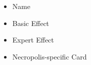 \bigskip
\begin{multicols}{2}
\begin{multicols*}{2}
  \footnotesize
  \begin{itemize}
    \item[\textbf{1.}] Name
    \item[\textbf{2.}] Basic Effect\\
    \item[\textbf{3.}] Expert Effect
    \item[\textbf{4.}] Necropolis-specific Card
  \end{itemize}
\end{multicols*}
\columnbreak
\centering
\vspace*{-5em}
\end{multicols}

